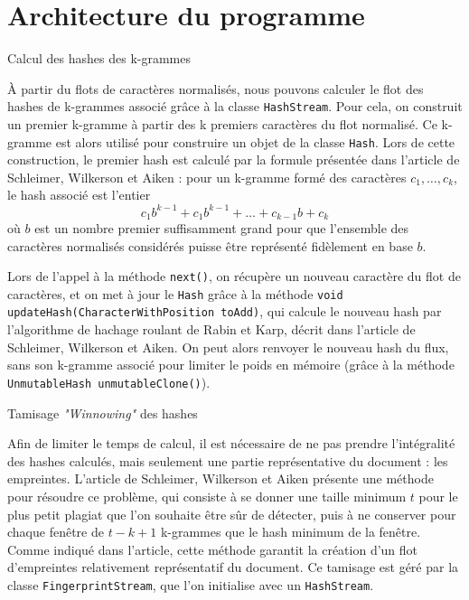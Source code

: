 \documentclass[a4paper,twoside,12pt]{article}
\newcounter{partie}
\newcounter{sous-partie}
\newenvironment{partie}[1]
{
\section{#1}
}
{

}
\newenvironment{sous-partie}[1]
{
\subsection{#1}
}
{

}
\begin{document}
\begin{partie}{Architecture du programme}
\begin{sous-partie}{Calcul des hashes des k-grammes}
\begin{paragraph}{}
À partir du flots de caractères normalisés, nous pouvons calculer le flot des hashes de k-grammes associé grâce à la classe \texttt{HashStream}. Pour cela, on construit un premier k-gramme à partir des k premiers caractères du flot normalisé. Ce k-gramme est alors utilisé pour construire un objet de la classe \texttt{Hash}. Lors de cette construction, le premier hash est calculé par la formule présentée dans l'article de Schleimer, Wilkerson et Aiken : pour un k-gramme formé des caractères $c_1,\dots,c_k$, le hash associé est l'entier
$$c_1b^{k-1}+c_1b^{k-1}+\dots+c_{k-1}b+c_k$$
où $b$ est un nombre premier suffisamment grand pour que l'ensemble des caractères normalisés considérés puisse être représenté fidèlement en base $b$.
\end{paragraph}
\begin{paragraph}{}
Lors de l'appel à la méthode \texttt{next()}, on récupère un nouveau caractère du flot de caractères, et on met à jour le \texttt{Hash} grâce à la méthode \texttt{void updateHash(CharacterWithPosition toAdd)}, qui calcule le nouveau hash par l'algorithme de hachage roulant de Rabin et Karp, décrit dans l'article de Schleimer, Wilkerson et Aiken. On peut alors renvoyer le nouveau hash du flux, sans son k-gramme associé pour limiter le poids en mémoire (grâce à la méthode \texttt{UnmutableHash unmutableClone()}).
\end{paragraph}

\end{sous-partie}

\begin{sous-partie}{Tamisage \textit{"Winnowing"} des hashes}
\begin{paragraph}{}
Afin de limiter le temps de calcul, il est nécessaire de ne pas prendre l'intégralité des hashes calculés, mais seulement une partie représentative du document : les empreintes. L'article de Schleimer, Wilkerson et Aiken présente une méthode pour résoudre ce problème, qui consiste à se donner une taille minimum $t$ pour le plus petit plagiat que l'on souhaite être sûr de détecter, puis à ne conserver pour chaque fenêtre de $t-k+1$ k-grammes que le hash minimum de la fenêtre. Comme indiqué dans l'article, cette méthode garantit la création d'un flot d'empreintes relativement représentatif du document. Ce tamisage est géré par la classe \texttt{FingerprintStream}, que l'on initialise avec un \texttt{HashStream}.
\end{paragraph}
\end{sous-partie}


\end{partie}
\end{document}
